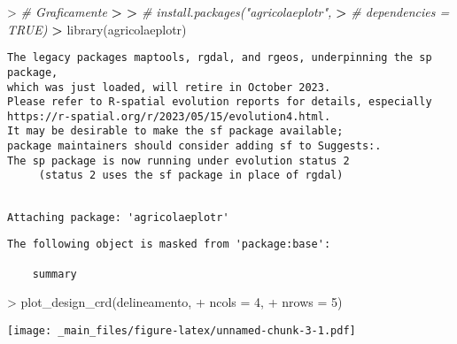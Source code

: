 \documentclass[
]{book}
\newenvironment{Shaded}{\begin{snugshade}}{\end{snugshade}}
\newcommand{\AttributeTok}[1]{\textcolor[rgb]{0.77,0.63,0.00}{#1}}
\newcommand{\CommentTok}[1]{\textcolor[rgb]{0.56,0.35,0.01}{\textit{#1}}}
\newcommand{\DecValTok}[1]{\textcolor[rgb]{0.00,0.00,0.81}{#1}}
\newcommand{\ErrorTok}[1]{\textcolor[rgb]{0.64,0.00,0.00}{\textbf{#1}}}
\newcommand{\FunctionTok}[1]{\textcolor[rgb]{0.00,0.00,0.00}{#1}}
\newcommand{\NormalTok}[1]{#1}
\newcommand{\SpecialCharTok}[1]{\textcolor[rgb]{0.00,0.00,0.00}{#1}}
\begin{document}
\begin{Shaded}
\begin{Highlighting}[]
\SpecialCharTok{\textgreater{}} \CommentTok{\# Graficamente}
\ErrorTok{\textgreater{}} 
\ErrorTok{\textgreater{}} \CommentTok{\# install.packages("agricolaeplotr", }
\ErrorTok{\textgreater{}} \CommentTok{\#                  dependencies = TRUE)}
\ErrorTok{\textgreater{}} \FunctionTok{library}\NormalTok{(agricolaeplotr)}
\end{Highlighting}
\end{Shaded}

\begin{verbatim}
The legacy packages maptools, rgdal, and rgeos, underpinning the sp package,
which was just loaded, will retire in October 2023.
Please refer to R-spatial evolution reports for details, especially
https://r-spatial.org/r/2023/05/15/evolution4.html.
It may be desirable to make the sf package available;
package maintainers should consider adding sf to Suggests:.
The sp package is now running under evolution status 2
     (status 2 uses the sf package in place of rgdal)
\end{verbatim}

\begin{verbatim}

Attaching package: 'agricolaeplotr'
\end{verbatim}

\begin{verbatim}
The following object is masked from 'package:base':

    summary
\end{verbatim}

\begin{Shaded}
\begin{Highlighting}[]
\SpecialCharTok{\textgreater{}} \FunctionTok{plot\_design\_crd}\NormalTok{(delineamento,}
\SpecialCharTok{+}                 \AttributeTok{ncols =} \DecValTok{4}\NormalTok{,}
\SpecialCharTok{+}                 \AttributeTok{nrows =} \DecValTok{5}\NormalTok{)}
\end{Highlighting}
\end{Shaded}

\texttt{[image: \_main\_files/figure-latex/unnamed-chunk-3-1.pdf]}
\end{document}
